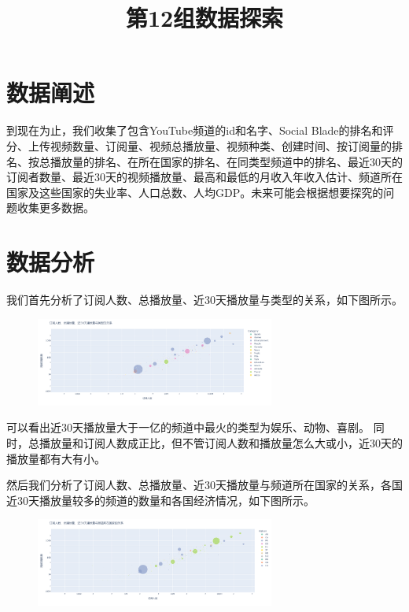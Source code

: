 \documentclass{article}
\begin{document}
\title{第12组数据探索}
\maketitle						%
\section{数据阐述}

到现在为止，我们收集了包含YouTube频道的id和名字、Social Blade的排名和评分、上传视频数量、订阅量、视频总播放量、视频种类、创建时间、按订阅量的排名、按总播放量的排名、在所在国家的排名、在同类型频道中的排名、最近30天的订阅者数量、最近30天的视频播放量、最高和最低的月收入年收入估计、频道所在国家及这些国家的失业率、人口总数、人均GDP。未来可能会根据想要探究的问题收集更多数据。

\section{数据分析}

我们首先分析了订阅人数、总播放量、近30天播放量与类型的关系，如下图所示。
\begin{figure}[H] %
\centering %
\includegraphics[width=0.7\textwidth]{pic/p1} %
\label{Fig.p1} %
\end{figure}
可以看出近30天播放量大于一亿的频道中最火的类型为娱乐、动物、喜剧。
同时，总播放量和订阅人数成正比，但不管订阅人数和播放量怎么大或小，近30天的播放量都有大有小。

然后我们分析了订阅人数、总播放量、近30天播放量与频道所在国家的关系，各国近30天播放量较多的频道的数量和各国经济情况，如下图所示。
\begin{figure}[H] %
\centering %
\includegraphics[width=0.7\textwidth]{pic/p2} %
\label{Fig.p2} %
\end{figure}
\end{document}
